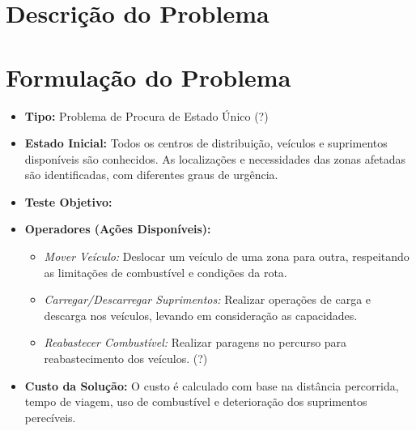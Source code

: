 \documentclass[a4paper,12pt]{scrreprt}
\begin{document}
\tableofcontents
\pagebreak

\listoffigures
\pagebreak

\listoftables
\pagebreak

\lstlistoflistings
\pagebreak





\chapter{Descrição do Problema}




\chapter{Formulação do Problema}

\begin{itemize}
    \item\textbf{Tipo:} Problema de Procura de Estado Único (?)
    \item\textbf{Estado Inicial:} Todos os centros de distribuição, veículos e suprimentos disponíveis são conhecidos.
     As localizações e necessidades das zonas afetadas são identificadas, com diferentes graus de urgência.
    \item\textbf{Teste Objetivo:} 
        \item\textbf{Operadores (Ações Disponíveis):} 
        \begin{itemize}
                \item\textit{Mover Veículo:} Deslocar um veículo de uma zona para outra, respeitando as limitações de combustível e condições da rota.
                \item\textit{Carregar/Descarregar Suprimentos:} Realizar operações de carga e descarga nos veículos, levando em consideração as capacidades.
                \item\textit{Reabastecer Combustível:} Realizar paragens no percurso para reabastecimento dos veículos. (?)
        \end{itemize}
    \item\textbf{Custo da Solução:} O custo é calculado com base na distância percorrida, tempo de viagem, uso de combustível e deterioração dos suprimentos perecíveis.
    \end{itemize}
\end{document}
